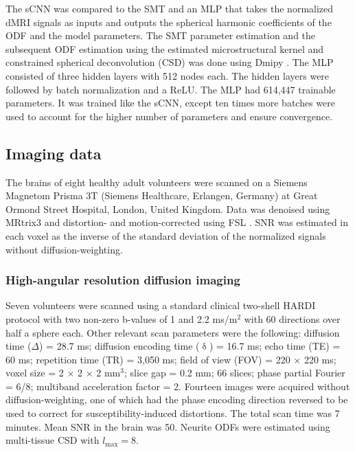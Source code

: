 \documentclass[10pt, letterpaper, oneside]{article}
\begin{document}
The sCNN was compared to the SMT and an MLP that takes the normalized dMRI signals as inputs and outputs the spherical harmonic coefficients of the ODF and the model parameters. The SMT parameter estimation and the subsequent ODF estimation using the estimated microstructural kernel and constrained spherical deconvolution (CSD) was done using Dmipy \citep{fick2019dmipy}. The MLP consisted of three hidden layers with 512 nodes each. The hidden layers were followed by batch normalization and a ReLU. The MLP had 614,447 trainable parameters. It was trained like the sCNN, except ten times more batches were used to account for the higher number of parameters and ensure convergence.

\subsection{Imaging data}

The brains of eight healthy adult volunteers were scanned on a Siemens Magnetom Prisma 3T (Siemens Healthcare, Erlangen, Germany) at Great Ormond Street Hospital, London, United Kingdom. Data was denoised \citep{veraart2016denoising} using MRtrix3 \citep{tournier2019mrtrix3} and distortion- and motion-corrected using FSL \citep{andersson2016integrated, jenkinson2012fsl}. SNR was estimated in each voxel as the inverse of the standard deviation of the normalized signals without diffusion-weighting.

\subsubsection{High-angular resolution diffusion imaging}

Seven volunteers were scanned using a standard clinical two-shell HARDI protocol with two non-zero b-values of 1 and 2.2 ms/\textmu m$^2$  with 60 directions over half a sphere each. Other relevant scan parameters were the following: diffusion time ($\Delta$) = 28.7 ms; diffusion encoding time ($\updelta$) = 16.7 ms; echo time (TE) = 60 ms; repetition time (TR) = 3,050 ms; field of view (FOV) = 220 × 220 ms; voxel size = 2 × 2 × 2 mm$^3$; slice gap = 0.2 mm; 66 slices; phase partial Fourier = 6/8; multiband acceleration factor = 2. Fourteen images were acquired without diffusion-weighting, one of which had the phase encoding direction reversed to be used to correct for susceptibility-induced distortions. The total scan time was 7 minutes. Mean SNR in the brain was 50. Neurite ODFs were estimated using multi-tissue CSD \citep{jeurissen2014multi} with $l_\text{max} = 8$.
\end{document}
